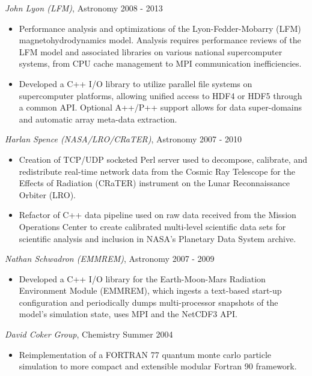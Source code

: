 \documentclass[line,margin]{res}
\begin{document}
\begin{resume}
          {\sl John Lyon (LFM)}, Astronomy \hfill 2008 - 2013
          \begin{itemize} \itemsep -2pt %
          \item
            Performance analysis and optimizations of the Lyon-Fedder-Mobarry (LFM) magnetohydrodynamics model.  Analysis requires performance reviews of the LFM model and associated libraries on various national supercomputer systems, from CPU cache management to MPI communication inefficiencies.
          \item
            Developed a C++ I/O library to utilize parallel file systems on supercomputer platforms, allowing unified access to HDF4 or HDF5 through a common API. Optional A++/P++ support allows for data super-domains and automatic array meta-data extraction.
          \end{itemize}

          {\sl Harlan Spence (NASA/LRO/CRaTER)}, Astronomy \hfill 2007 - 2010
          \begin{itemize} \itemsep -2pt
          \item
            Creation of TCP/UDP socketed Perl server used to decompose, calibrate, and redistribute real-time network data from the Cosmic Ray Telescope for the Effects of Radiation (CRaTER) instrument on the Lunar Reconnaissance Orbiter (LRO).
          \item
            Refactor of C++ data pipeline used on raw data received from the Mission Operations Center to create calibrated multi-level scientific data sets for scientific analysis and inclusion in NASA's Planetary Data System archive.
          \end{itemize}

          {\sl Nathan Schwadron (EMMREM)}, Astronomy \hfill 2007 - 2009
          \begin{itemize} \itemsep -2pt
          \item
            Developed a C++ I/O library for the Earth-Moon-Mars Radiation Environment Module (EMMREM), which ingests a text-based start-up configuration and periodically dumps multi-processor snapshots of the model's simulation state, uses MPI and the NetCDF3 API.
          \end{itemize}

          {\sl David Coker Group}, Chemistry \hfill Summer 2004
          \begin{itemize} \itemsep -2pt
          \item
            Reimplementation of a FORTRAN 77 quantum monte carlo particle simulation to more compact and extensible modular Fortran 90 framework.
          \end{itemize}


\end{resume}
\end{document}
